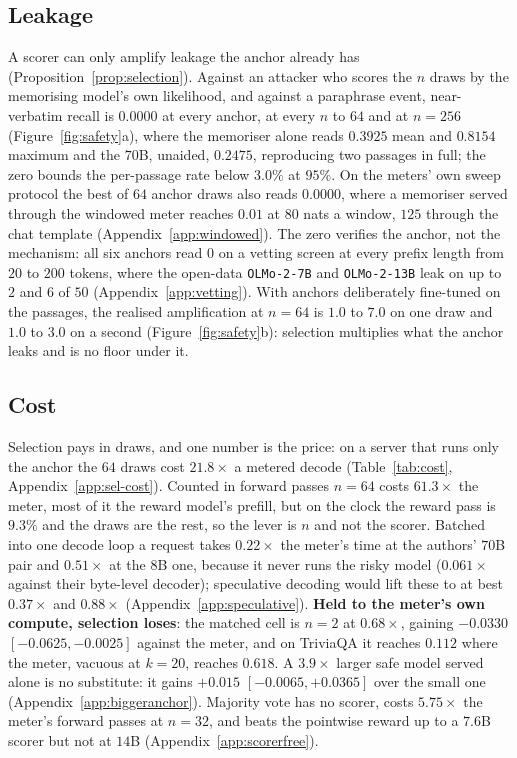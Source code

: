 \subsection{Leakage}\label{sec:leakage}

A scorer can only amplify leakage the anchor already has (Proposition~\ref{prop:selection}). Against an attacker who scores the $n$ draws by the
memorising model's own likelihood, and against a paraphrase event, near-verbatim recall is $0.0000$ at
every anchor, at every $n$ to $64$ and at $n=256$ (Figure~\ref{fig:safety}a), where the memoriser alone
reads $0.3925$ mean and $0.8154$ maximum and the $70$B, unaided, $0.2475$, reproducing two passages in full;
the zero bounds the per-passage rate below $3.0\%$ at $95\%$. On the meters' own sweep protocol the best of $64$ anchor draws also reads $0.0000$, where a
memoriser served through the windowed meter reaches $0.01$ at $80$ nats a window, $125$ through the chat
template (Appendix~\ref{app:windowed}). The zero verifies the anchor, not the mechanism: all six
anchors read $0$ on a vetting screen at every prefix length from $20$ to $200$ tokens, where the open-data
\texttt{OLMo-2-7B} and \texttt{OLMo-2-13B} \citep{olmo2024olmo2} leak on up to $2$ and $6$ of $50$
(Appendix~\ref{app:vetting}). With anchors deliberately
fine-tuned on the passages, the realised amplification at $n=64$ is $1.0$ to $7.0$ on one draw and $1.0$
to $3.0$ on a second (Figure~\ref{fig:safety}b): selection multiplies what the anchor leaks and is no
floor under it.

\subsection{Cost}\label{sec:cost}

Selection pays in draws, and one number is the price: on a server that runs only the anchor the $64$ draws
cost $21.8\times$ a metered decode (Table~\ref{tab:cost}, Appendix~\ref{app:sel-cost}). Counted in forward passes $n=64$ costs $61.3\times$ the
meter, most of it the reward model's prefill, but on the clock the reward pass is $9.3\%$ and the draws are
the rest, so the lever is $n$ and not the scorer. Batched into one decode loop a request takes $0.22\times$
the meter's time at the authors' $70$B pair and $0.51\times$ at the $8$B one, because it never runs the risky model
($0.061\times$ against their byte-level decoder); speculative decoding would
lift these to at best $0.37\times$ and $0.88\times$ (Appendix~\ref{app:speculative}).
\textbf{Held to the meter's own compute, selection loses}: the matched cell is $n=2$ at $0.68\times$,
gaining $-0.0330$ $[-0.0625, -0.0025]$ against the meter, and on TriviaQA it reaches $0.112$ where the
meter, vacuous at $k=20$, reaches $0.618$. A $3.9\times$ larger safe model served alone is no substitute:
it gains $+0.015$ $[-0.0065, +0.0365]$ over the small one (Appendix~\ref{app:biggeranchor}). Majority
vote has no scorer, costs $5.75\times$ the meter's forward passes at $n=32$, and beats the pointwise reward
up to a $7.6$B scorer but not at $14$B (Appendix~\ref{app:scorerfree}).
